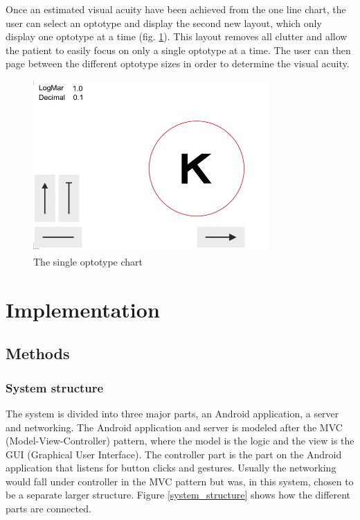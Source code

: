 \documentclass[12pt,a4paper,notitlepage]{report}
\begin{document}
\pagebreak
Once an estimated visual acuity have been achieved from the one line chart, the user can select an optotype and display the second new layout, which only display one optotype at a time (fig. \ref{fig:etdrs_single}). This layout removes all clutter and allow the patient to easily focus on only a single optotype at a time. The user can then page between the different optotype sizes in order to determine the visual acuity.

\begin{figure}[ht!  ]
\centering
\includegraphics[width=90mm]{images/etdrs_single.png}
\caption{The single optotype chart}
\label{fig:etdrs_single}
\end{figure}

\chapter{ Implementation}
\section{Methods}
\subsection{System structure}
The system is divided into three major parts, an Android application, a server and networking. The Android application and server is modeled after the MVC (Model-View-Controller) pattern, where the model is the logic and the view is the GUI (Graphical User Interface). The controller part is the part on the Android application that listens for button clicks and gestures. Usually the networking would fall under controller in the MVC pattern but was, in this system, chosen to be a separate larger structure. Figure \ref{system_structure} shows how the different parts are connected.
\end{document}
